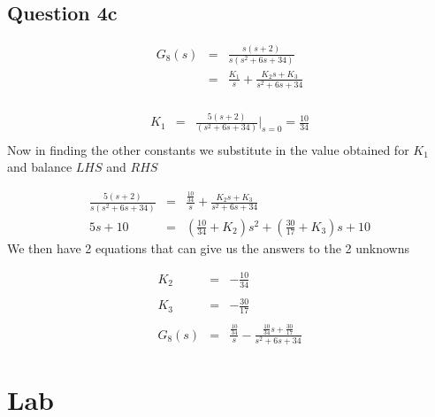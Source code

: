 \documentclass[12pt, a4paper]{article}
\begin{document}
	\subsection*{Question 4c}
	\label{sub:question_4c}
		\begin{equation*}
			\begin{array}{rcl}
				G_8 (s) & = & \frac{s(s+2)}{s(s^2+6s+34)} \\
				& = & \frac{K_1}{s}+\frac{K_2s + K_3}{s^2+6s+34}\\ 
			\end{array}
		\end{equation*}

		\begin{equation*}
			\begin{array}{rcl}
				K_1  & = & \frac{5(s+2)}{(s^2+6s+34)}\bigg\rvert_{s=0} = \frac{10}{34}
				\\ 
			\end{array}
		\end{equation*}
		Now in finding the other constants we substitute in the value obtained for $K_1$ and balance $LHS$ and $RHS$

		\begin{equation*}
			\begin{array}{rcl}
				\frac{5(s+2)}{s(s^2+6s+34)}  & = & \frac{\frac{10}{34}}{s} + \frac{K_2s+K_3}{s^2+6s+34}\\
				5s+10 & = & (\frac{10}{34}+K_2)s^2 + (\frac{30}{17}+K_3)s +10 
			\end{array}
		\end{equation*}
		We then have 2 equations that can give us the answers to the 2 unknowns 

		\begin{equation*}
			\begin{array}{rcl}
				K_2 & = & - \frac{10}{34}\\
				\\
				K_3 & = & - \frac{30}{17}\\
				\\
				G_8(s) & = & \frac{\frac{10}{34}}{s} - \frac{\frac{10}{34}s+\frac{30}{17}}{s^2+6s+34}
			\end{array}
		\end{equation*}



	\section{Lab} %
	\label{sec:lab}
\end{document}
